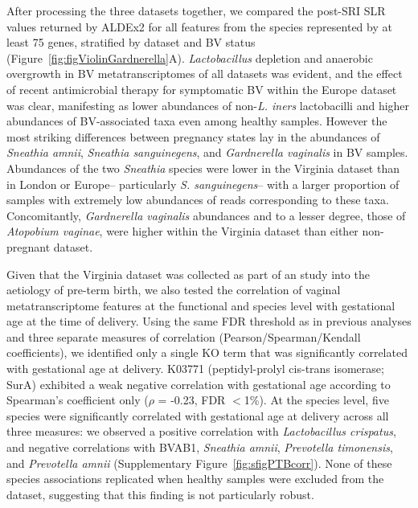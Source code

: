 \documentclass[sn-mathphys,Numbered]{sn-jnl}%
\begin{document}
After processing the three datasets together, we compared the post-SRI SLR values returned by ALDEx2 for all features from the species represented by at least 75 genes, stratified by dataset and BV status (Figure~\ref{fig:figViolinGardnerella}A). \textit{Lactobacillus} depletion and anaerobic overgrowth in BV metatranscriptomes of all datasets was evident, and the effect of recent antimicrobial therapy for symptomatic BV within the Europe dataset was clear, manifesting as lower abundances of non-\textit{L. iners} lactobacilli and higher abundances of BV-associated taxa even among healthy samples. However the most striking differences between pregnancy states lay in the abundances of \textit{Sneathia amnii}, \textit{Sneathia sanguinegens}, and \textit{Gardnerella vaginalis} in BV samples. Abundances of the two \textit{Sneathia} species were lower in the Virginia dataset than in London or Europe-- particularly \textit{S. sanguinegens}-- with a larger proportion of samples with extremely low abundances of reads corresponding to these taxa. Concomitantly, \textit{Gardnerella vaginalis} abundances and to a lesser degree, those of \textit{Atopobium vaginae}, were higher within the Virginia dataset than either non-pregnant dataset.

Given that the Virginia dataset was collected as part of an study into the aetiology of pre-term birth, we also tested the correlation of vaginal metatranscriptome features at the functional and species level with gestational age at the time of delivery. Using the same FDR threshold as in previous analyses and three separate measures of correlation (Pearson/Spearman/Kendall coefficients), we identified only a single KO term that was significantly correlated with gestational age at delivery. K03771 (peptidyl-prolyl cis-trans isomerase; SurA) exhibited a weak negative correlation with gestational age according to Spearman's coefficient only ($\rho$ = -0.23, FDR $<$1\%). At the species level, five species were significantly correlated with gestational age at delivery across all three measures: we observed a positive correlation with \textit{Lactobacillus crispatus}, and negative correlations with BVAB1, \textit{Sneathia amnii}, \textit{Prevotella timonensis}, and \textit{Prevotella amnii} (Supplementary Figure~\ref{fig:sfigPTBcorr}). None of these species associations replicated when healthy samples were excluded from the dataset, suggesting that this finding is not particularly robust.
\end{document}
